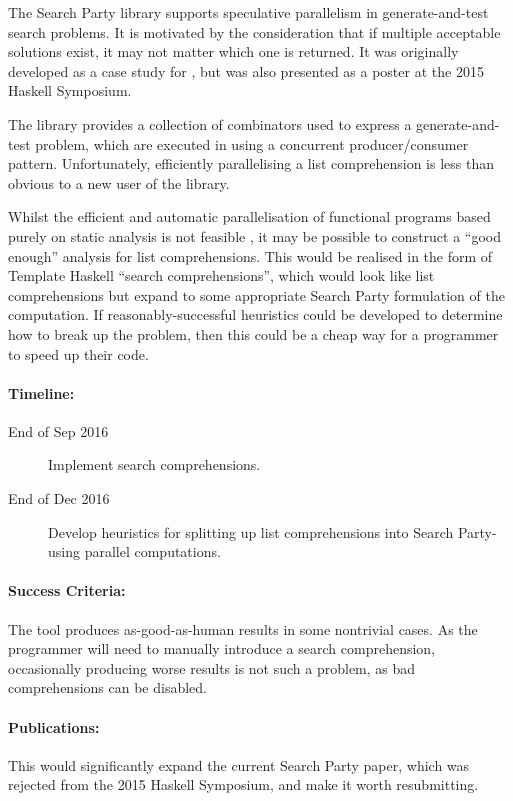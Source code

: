 The Search Party library supports speculative parallelism in
generate-and-test search problems. It is motivated by the
consideration that if multiple acceptable solutions exist, it may not
matter which one is returned. It was originally developed as a case
study for \dejafu{}, but was also presented as a poster at the 2015
Haskell Symposium.

The library provides a collection of combinators used to express a
generate-and-test problem, which are executed in using a concurrent
producer/consumer pattern. Unfortunately, efficiently parallelising a
list comprehension is less than obvious to a new user of the library.

Whilst the efficient and automatic parallelisation of functional
programs based purely on static analysis is not feasible
\citep{autopar}, it may be possible to construct a ``good enough''
analysis for list comprehensions. This would be realised in the form
of Template Haskell ``search comprehensions'', which would look like
list comprehensions but expand to some appropriate Search Party
formulation of the computation. If reasonably-successful heuristics
could be developed to determine how to break up the problem, then this
could be a cheap way for a programmer to speed up their code.

\paragraph{Timeline:}

\begin{description}
\item[End of Sep 2016] Implement search comprehensions.

\item[End of Dec 2016] Develop heuristics for splitting up list
  comprehensions into Search Party-using parallel computations.
\end{description}

\paragraph{Success Criteria:}

The tool produces as-good-as-human results in some nontrivial
cases. As the programmer will need to manually introduce a search
comprehension, occasionally producing worse results is not such a
problem, as bad comprehensions can be disabled.

\paragraph{Publications:}

This would significantly expand the current Search Party paper, which
was rejected from the 2015 Haskell Symposium, and make it worth
resubmitting.
